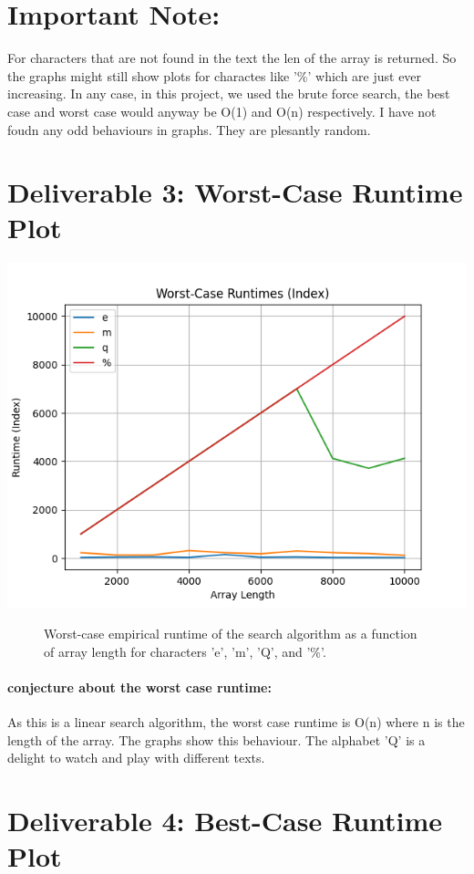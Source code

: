 \documentclass{article}
\begin{document}
\section*{Important Note: }
For characters that are not found in the text the len of the array is returned. So the graphs might still show plots for charactes like '\%'
which are just ever increasing. In any case, in this project, we used the brute force search, the best case and worst case would anyway be O(1) and O(n) respectively.
I have not foudn any odd behaviours in graphs. They are plesantly random. 
\section*{Deliverable 3: Worst-Case Runtime Plot}

\includegraphics[width=\textwidth]{worst-case_runtimes_(index).png} \label{Figure 1}
\begin{figure}
    \caption{Worst-case empirical runtime of the search algorithm as a function of array length for characters 'e', 'm', 'Q', and '\%'.}
\end{figure}

\paragraph*{conjecture about the worst case runtime: }
As this is a linear search algorithm,
the worst case runtime is O(n) where n is the length of the array. The graphs show this behaviour. The alphabet 'Q' is a delight to watch and play with different texts. 
\section*{Deliverable 4: Best-Case Runtime Plot}
\end{document}
